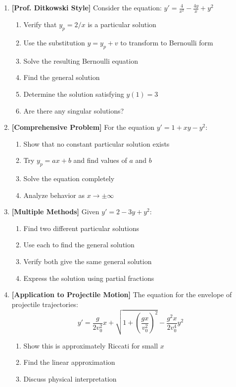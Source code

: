 \documentclass[12pt]{article}
\begin{document}
\begin{enumerate}[resume]
    \item \textbf{[Prof. Ditkowski Style]}
    Consider the equation: $y' = \frac{4}{x^2} - \frac{4y}{x} + y^2$
    \begin{enumerate}[label=(\alph*)]
        \item Verify that $y_p = 2/x$ is a particular solution
        \item Use the substitution $y = y_p + v$ to transform to Bernoulli form
        \item Solve the resulting Bernoulli equation
        \item Find the general solution
        \item Determine the solution satisfying $y(1) = 3$
        \item Are there any singular solutions?
    \end{enumerate}

    \item \textbf{[Comprehensive Problem]}
    For the equation $y' = 1 + xy - y^2$:
    \begin{enumerate}[label=(\alph*)]
        \item Show that no constant particular solution exists
        \item Try $y_p = ax + b$ and find values of $a$ and $b$
        \item Solve the equation completely
        \item Analyze behavior as $x \to \pm\infty$
    \end{enumerate}

    \item \textbf{[Multiple Methods]}
    Given $y' = 2 - 3y + y^2$:
    \begin{enumerate}[label=(\alph*)]
        \item Find two different particular solutions
        \item Use each to find the general solution
        \item Verify both give the same general solution
        \item Express the solution using partial fractions
    \end{enumerate}

    \item \textbf{[Application to Projectile Motion]}
    The equation for the envelope of projectile trajectories:
    $$y' = \frac{g}{2v_0^2}x + \sqrt{1 + \left(\frac{gx}{v_0^2}\right)^2} - \frac{g^2x}{2v_0^4}y^2$$
    \begin{enumerate}[label=(\alph*)]
        \item Show this is approximately Riccati for small $x$
        \item Find the linear approximation
        \item Discuss physical interpretation
    \end{enumerate}


\end{enumerate}
\end{document}
